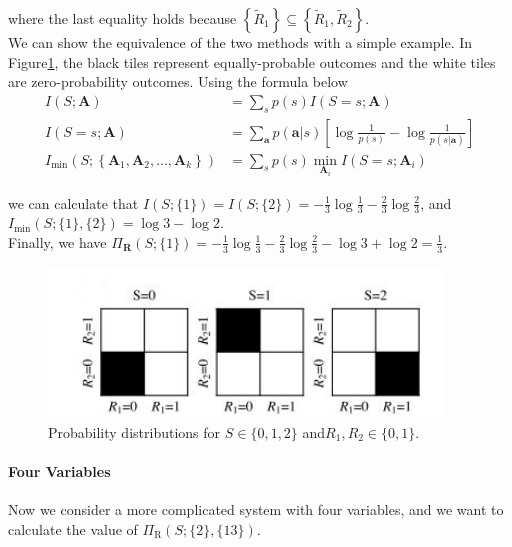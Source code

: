 where the last equality holds because $\left\{ \tilde{R}_1 \right\} \subseteq \left\{\tilde{R}_1, \tilde{R}_2 \right\}$.\\

We can show the equivalence of the two methods with a simple example. In Figure\ref{fig8}, the black tiles represent equally-probable outcomes and the white tiles are zero-probability outcomes. Using the formula below
\begin{equation}
\begin{aligned}
    I(S ; \mathbf{A}) &=\sum_{s} p(s) I(S=s ; \mathbf{A}) \\
    I(S=s ; \mathbf{A}) &=\sum_{\mathbf{a}} p(\mathbf{a} | s)\left[\log \frac{1}{p(s)}-\log \frac{1}{p(s | \mathbf{a})}\right] \\
    I_{\min }\left(S ;\left\{\mathbf{A}_{1}, \mathbf{A}_{2}, \ldots, \mathbf{A}_{k}\right\}\right)&=\sum_{s} p(s) \min _{\mathbf{A}_{i}} I\left(S=s ; \mathbf{A}_{i}\right)
\end{aligned}
\end{equation}

we can calculate that $I\left(S ; \{1\}\right)=I\left(S ; \{2\}\right)=-\frac{1}{3} \log \frac{1}{3}-\frac{2}{3} \log \frac{2}{3}$, and $I_{\min }(S ; \{1\},\{2\})=\log 3-\log 2$.\\
Finally, we have $\Pi_{\mathbf{R}}(S ; \{1\})=-\frac{1}{3} \log \frac{1}{3}-\frac{2}{3} \log \frac{2}{3}-\log 3+\log 2=\frac{1}{3}$.

\begin{figure}[ht]
 
\centering
\includegraphics[height=4cm]{tex/example.jpg}
\caption{Probability distributions for $S\in\{0,1,2\}$ and$R_1,R_2\in\{0,1\}$.}
\label{fig8}
 
\end{figure}

\paragraph{Four Variables}
Now we consider a more complicated system with four variables, and we want to calculate the value of $\Pi_{\mathrm{R}}(S ; \{2\},\{13\})$.

